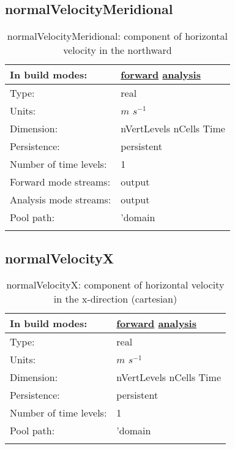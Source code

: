 \subsection[normalVelocityMeridional]{normalVelocityMeridional}
\label{subsec:var_sec_diagnostics_normalVelocityMeridional}
\begin{center}
\begin{longtable}{| p{2.0in} | p{4.0in} |}
        \hline 
        In build modes: & \hyperref[subsec:forward_var_tab_diagnostics]{forward} \hyperref[subsec:analysis_var_tab_diagnostics]{analysis} \\
        \hline 
        Type: & real \\
        \hline 
        Units: & $m$ $s^{-1}$ \\
        \hline 
        Dimension: & nVertLevels nCells Time \\
        \hline 
        Persistence: & persistent \\
        \hline 
        Number of time levels: & 1 \\
        \hline 
		 Forward mode streams: &  output \\
        \hline 
		 Analysis mode streams: &  output \\
        \hline 
            Pool path: & 'domain %
 \\
		 \hline 
    \caption{normalVelocityMeridional: component of horizontal velocity in the northward}
\end{longtable}
\end{center}
\subsection[normalVelocityX]{normalVelocityX}
\label{subsec:var_sec_diagnostics_normalVelocityX}
\begin{center}
\begin{longtable}{| p{2.0in} | p{4.0in} |}
        \hline 
        In build modes: & \hyperref[subsec:forward_var_tab_diagnostics]{forward} \hyperref[subsec:analysis_var_tab_diagnostics]{analysis} \\
        \hline 
        Type: & real \\
        \hline 
        Units: & $m$ $s^{-1}$ \\
        \hline 
        Dimension: & nVertLevels nCells Time \\
        \hline 
        Persistence: & persistent \\
        \hline 
        Number of time levels: & 1 \\
        \hline 
            Pool path: & 'domain %
 \\
		 \hline 
    \caption{normalVelocityX: component of horizontal velocity in the x-direction (cartesian)}
\end{longtable}
\end{center}
